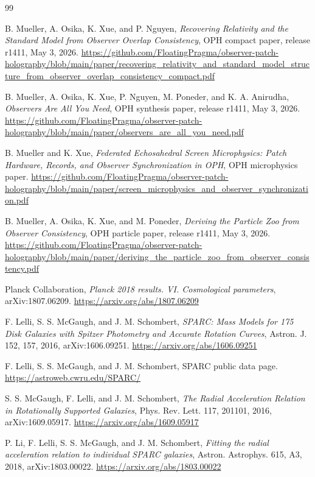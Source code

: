 \documentclass[11pt]{article}
\begin{document}
\begin{thebibliography}{99}

B. Mueller, A. Osika, K. Xue, and P. Nguyen,
\emph{Recovering Relativity and the Standard Model from Observer Overlap Consistency},
OPH compact paper, release r1411, May 3, 2026.
\url{https://github.com/FloatingPragma/observer-patch-holography/blob/main/paper/recovering_relativity_and_standard_model_structure_from_observer_overlap_consistency_compact.pdf}

B. Mueller, A. Osika, K. Xue, P. Nguyen, M. Poneder, and K. A. Anirudha,
\emph{Observers Are All You Need}, OPH synthesis paper, release r1411,
May 3, 2026.
\url{https://github.com/FloatingPragma/observer-patch-holography/blob/main/paper/observers_are_all_you_need.pdf}

B. Mueller and K. Xue,
\emph{Federated Echosahedral Screen Microphysics: Patch Hardware, Records, and Observer Synchronization in OPH},
OPH microphysics paper.
\url{https://github.com/FloatingPragma/observer-patch-holography/blob/main/paper/screen_microphysics_and_observer_synchronization.pdf}

B. Mueller, A. Osika, K. Xue, and M. Poneder,
\emph{Deriving the Particle Zoo from Observer Consistency},
OPH particle paper, release r1411, May 3, 2026.
\url{https://github.com/FloatingPragma/observer-patch-holography/blob/main/paper/deriving_the_particle_zoo_from_observer_consistency.pdf}

Planck Collaboration,
\emph{Planck 2018 results. VI. Cosmological parameters},
arXiv:1807.06209.
\url{https://arxiv.org/abs/1807.06209}

F. Lelli, S. S. McGaugh, and J. M. Schombert,
\emph{SPARC: Mass Models for 175 Disk Galaxies with Spitzer Photometry and Accurate Rotation Curves},
Astron. J. 152, 157, 2016, arXiv:1606.09251.
\url{https://arxiv.org/abs/1606.09251}

F. Lelli, S. S. McGaugh, and J. M. Schombert,
SPARC public data page.
\url{https://astroweb.cwru.edu/SPARC/}

S. S. McGaugh, F. Lelli, and J. M. Schombert,
\emph{The Radial Acceleration Relation in Rotationally Supported Galaxies},
Phys. Rev. Lett. 117, 201101, 2016, arXiv:1609.05917.
\url{https://arxiv.org/abs/1609.05917}

P. Li, F. Lelli, S. S. McGaugh, and J. M. Schombert,
\emph{Fitting the radial acceleration relation to individual SPARC galaxies},
Astron. Astrophys. 615, A3, 2018, arXiv:1803.00022.
\url{https://arxiv.org/abs/1803.00022}


\end{thebibliography}
\end{document}
